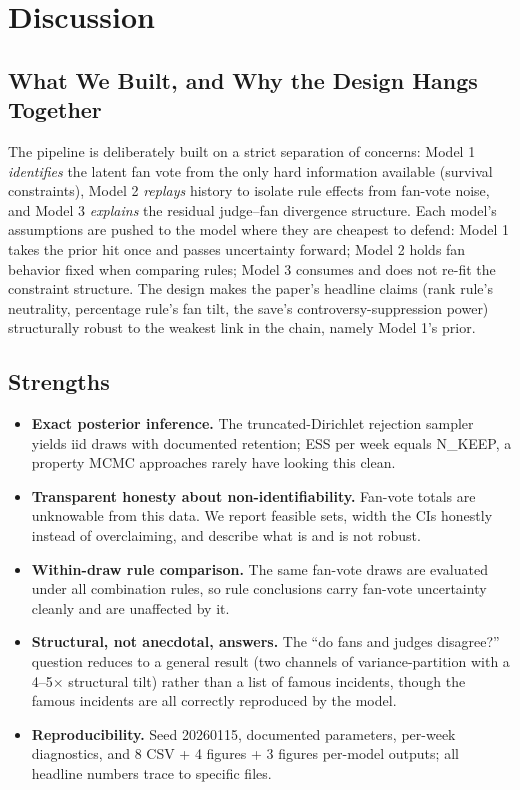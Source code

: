 \documentclass{article}
\begin{document}
\section{Discussion}
\label{sec:discussion}

\subsection{What We Built, and Why the Design Hangs Together}

The pipeline is deliberately built on a strict separation of concerns: Model 1 \emph{identifies} the latent fan vote from the only hard information available (survival constraints), Model 2 \emph{replays} history to isolate rule effects from fan-vote noise, and Model 3 \emph{explains} the residual judge--fan divergence structure. Each model's assumptions are pushed to the model where they are cheapest to defend: Model 1 takes the prior hit once and passes uncertainty forward; Model 2 holds fan behavior fixed when comparing rules; Model 3 consumes and does not re-fit the constraint structure. The design makes the paper's headline claims (rank rule's neutrality, percentage rule's fan tilt, the save's controversy-suppression power) structurally robust to the weakest link in the chain, namely Model 1's prior.

\subsection{Strengths}

\begin{itemize}
  \item \textbf{Exact posterior inference.} The truncated-Dirichlet rejection sampler yields iid draws with documented retention; ESS per week equals N\_KEEP, a property MCMC approaches rarely have looking this clean.
  \item \textbf{Transparent honesty about non-identifiability.} Fan-vote totals are unknowable from this data. We report feasible sets, width the CIs honestly instead of overclaiming, and describe what is and is not robust.
  \item \textbf{Within-draw rule comparison.} The same fan-vote draws are evaluated under all combination rules, so rule conclusions carry fan-vote uncertainty cleanly and are unaffected by it.
  \item \textbf{Structural, not anecdotal, answers.} The ``do fans and judges disagree?'' question reduces to a general result (two channels of variance-partition with a 4--5$\times$ structural tilt) rather than a list of famous incidents, though the famous incidents are all correctly reproduced by the model.
  \item \textbf{Reproducibility.} Seed 20260115, documented parameters, per-week diagnostics, and 8 CSV + 4 figures + 3 figures per-model outputs; all headline numbers trace to specific files.
\end{itemize}
\end{document}
